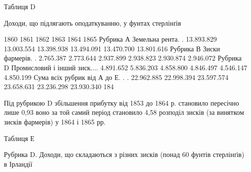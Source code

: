 Таблиця D

Доходи, що підлягають оподаткуванню, у фунтах стерлінґів

                                              1860    1861    1862    1863    1864    1865
Рубрика А
Земельна рента. .    13.893.829    13.003.554    13.398.938    13.494.091    13.470.700   
13.801.616
Рубрика В
Зиски фармерів. .    2.765.387    2.773.644    2.937.899    2.938.823    2.930.874    2.946.072
Рубрика D
Промисловий і інший
зиск....    4.891.652    5.836.203    4.858.800    4.846.497    4.546.147    4.850.199
Сума всіх рубрик
від А до Е. . .    22.962.885    22.998.394    23.597.574    23.658.631    23.236.298     23.930.340
184

Під рубрикою D збільшення прибутку від 1853 до 1864 р.
становило пересічно лише 0,93%
воно за той самий період становило 4,58%
розподіл зисків (за винятком зисків фармерів) у 1864 і
1865 рр.

Таблиця Е

Рубрика D. Доходи, що складаються з різних зисків (понад 60 фунтів
стерлінґів) в Ірландії

